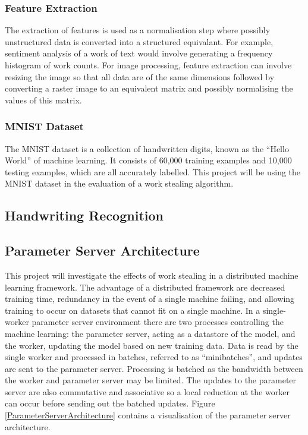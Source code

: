 \documentclass[12pt]{article}
\begin{document}
\subsubsection{Feature Extraction}
The extraction of features is used as a normalisation step where possibly unstructured data is converted into a structured equivalant. For example, sentiment analysis of a work of text would involve generating a frequency histogram of work counts.
\newline
\newline
For image processing, feature extraction can involve resizing the image so that all data are of the same dimensions followed by converting a raster image to an equivalent matrix and possibly normalising the values of this matrix.
\newline
\subsubsection{MNIST Dataset}
The MNIST dataset is a collection of handwritten digits, known as the ``Hello World'' of machine learning. It consists of 60,000 training examples and 10,000 testing examples, which are all accurately labelled. This project will be using the MNIST dataset in the evaluation of a work stealing algorithm.
\newline
\subsection{Handwriting Recognition}
\subsection{Parameter Server Architecture} \label{paramserver}
This project will investigate the effects of work stealing in a distributed machine learning framework. The advantage of a distributed framework are decreased training time, redundancy in the event of a single machine failing, and allowing training to occur on datasets that cannot fit on a single machine.
\newline
\newline
In a single-worker parameter server environment there are two processes controlling the machine learning: the parameter server, acting as a datastore of the model, and the worker, updating the model based on new training data. Data is read by the single worker and processed in batches, referred to as ``minibatches'', and updates are sent to the parameter server. Processing is batched as the bandwidth between the worker and parameter server may be limited. The updates to the parameter server are also commutative and associative so a local reduction at the worker can occur before sending out the batched updates.
\newline
Figure \ref{ParameterServerArchitecture} contains a visualisation of the parameter server architecture.
\end{document}

